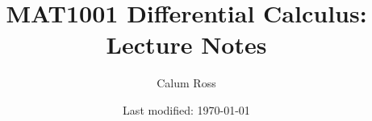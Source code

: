 \documentclass{book}
\begin{document}
\title{MAT1001 Differential Calculus: Lecture Notes}
\author{Calum Ross}
\date{Last modified: \today}
\maketitle %
\tableofcontents %

\mainmatter


\newpage



\newpage



\newpage



\newpage



\newpage



\newpage



\newpage




\newpage




\newpage




\newpage



\newpage

\end{document}
